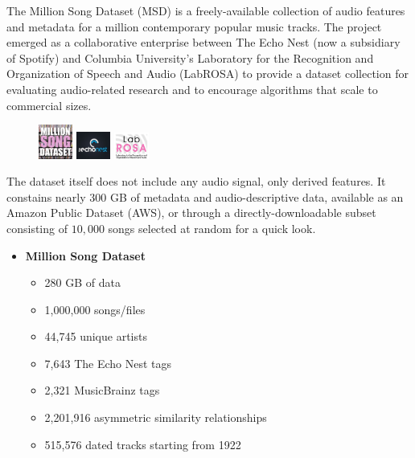 \documentclass[10pt,twocolumn,letterpaper]{article}
\begin{document}
The Million Song Dataset (MSD) \cite{Bertin-Mahieux2011} is a freely-available
collection of audio features and metadata for a million contemporary popular
music tracks. The project emerged as a collaborative enterprise between The
Echo Nest (now a subsidiary of Spotify) and Columbia University's
Laboratory for the Recognition and Organization of Speech and Audio (LabROSA) to
provide a dataset collection for evaluating audio-related research and to
encourage algorithms that scale to commercial sizes.

\begin{figure}
\centering
\includegraphics[width=0.1\textwidth]{img/LogoMSD.jpg}
\includegraphics[width=0.1\textwidth]{img/LogoTheEchoNest.jpg}
\includegraphics[width=0.1\textwidth]{img/LogoLabROSA.jpg}
\end{figure} 

The dataset itself does not include any audio signal, only derived
features. It constains nearly $300$ GB of metadata and audio-descriptive
data, available as an Amazon Public Dataset (AWS), or through a
directly-downloadable subset consisting of $10,000$ songs selected at random for
a quick look. 

\begin{itemize}
  \item \textbf{Million Song Dataset}
  \begin{itemize}
  \item 280 GB of data
  \item 1,000,000 songs/files
  \item 44,745 unique artists
  \item 7,643 The Echo Nest tags 
  \item 2,321 MusicBrainz tags
  \item 2,201,916 asymmetric similarity relationships
  \item 515,576 dated tracks starting from 1922
  \end{itemize}
\end{itemize}
\end{document}
